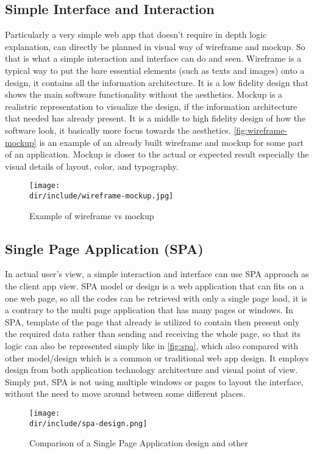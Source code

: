 \subsection{Simple Interface and Interaction}
\label{ssec:simple-interface-interaction}

Particularly a very simple web app that doesn't require in depth logic explanation, can directly be planned in visual way of wireframe and mockup.
So that is what a simple interaction and interface can do and seen.
Wireframe is a typical way to put the bare essential elements (such as texts and images) onto a design, it contains all the information architecture.
It is a low fidelity design that shows the main software functionality without the aesthetics.
Mockup is a realistric representation to visualize the design, if the information architecture that needed has already present.
It is a middle to high fidelity design of how the software look, it basically more focus towards the aesthetics.
\autoref{fig:wireframe-mockup} is an example of an already built wireframe and mockup for some part of an application.
Mockup is closer to the actual or expected result especially the visual details of layout, color, and typography.

\begin{figure}[htbp]
  \centering
  \texttt{[image: \\dir/include/wireframe-mockup.jpg]}
  \caption[Wireframe vs Mockup Example]{Example of wireframe vs mockup \autocite{Trentini2015WM}}
  \label{fig:wireframe-mockup}
\end{figure}

\subsection{Single Page Application (SPA)}
\label{ssec:spa}

In actual user's view, a simple interaction and interface can use \ac{SPA} approach as the client app view.
\ac{SPA} model or design is a web application that can fits on a one web page, so all the codes can be retrieved with only a single page load, it is a contrary to the multi page application that has many pages or windows.
In \ac{SPA}, template of the page that already is utilized to contain then present only the required data rather than sending and receiving the whole page, so that its logic can also be represented simply like in \autoref{fig:spa}, which also compared with other model/design which is a common or traditional web app design.
It employs design from both application technology architecture and visual point of view.
Simply put, \ac{SPA} is not using multiple windows or pages to layout the interface, without the need to move around between some different places.

\begin{figure}[htbp]
  \centering
  \texttt{[image: \\dir/include/spa-design.png]}
  \caption[Single Page Application design comparison]{Comparison of a Single Page Application design and other}
  \label{fig:spa}
\end{figure}

